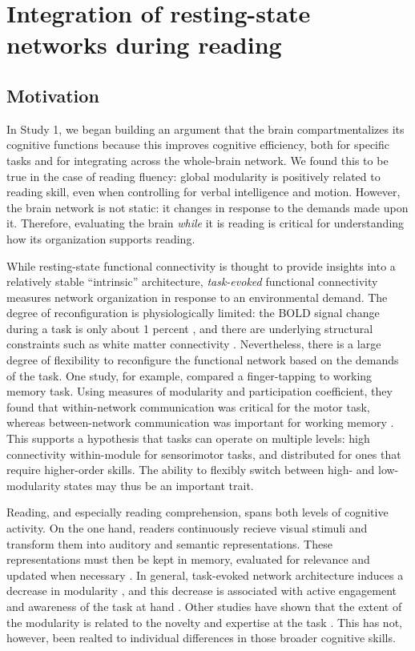 \chapter{Integration of resting-state networks during reading}

\section{Motivation}

In Study 1, we began building an argument that the brain compartmentalizes its cognitive functions because this improves cognitive efficiency, both for specific tasks and for integrating across the whole-brain network. We found this to be true in the case of reading fluency: global modularity is positively related to reading skill, even when controlling for verbal intelligence and motion. However, the brain network is not static: it changes in response to the demands made upon it. Therefore, evaluating the brain \textit{while} it is reading is critical for understanding how its organization supports reading. 

While resting-state functional connectivity is thought to provide insights into a relatively stable ``intrinsic'' architecture, \textit{task-evoked} functional connectivity measures network organization in response to an environmental demand. The degree of reconfiguration is physiologically limited: the BOLD signal change during a task is only about 1 percent \citep{Fox2007}, and there are underlying structural constraints such as white matter connectivity \citep{Sui2014}. Nevertheless, there is a large degree of flexibility to reconfigure the functional network based on the demands of the task. One study, for example, compared a finger-tapping to working memory task. Using measures of modularity and participation coefficient, they found that within-network communication was critical for the motor task, whereas between-network communication was important for working memory \citep{Cohen2016}. This supports a hypothesis that tasks can operate on multiple levels: high connectivity within-module for sensorimotor tasks, and distributed for ones that require higher-order skills. The ability to flexibly switch between high- and low-modularity states may thus be an important trait.

Reading, and especially reading comprehension, spans both levels of cognitive activity. On the one hand, readers continuously recieve visual stimuli and transform them into auditory and semantic representations. These representations must then be kept in memory, evaluated for relevance and updated when necessary \citep{Maguire1999}. In general, task-evoked network architecture induces a decrease in modularity \citep{Cole2014}, and this decrease is associated with active engagement and awareness of the task at hand \citep{Godwin2015}. Other studies have shown that the extent of the modularity is related to the novelty and expertise at the task \citep{Bassett2014}. This has not, however, been realted to individual differences in those broader cognitive skills.

